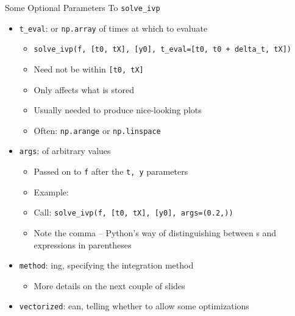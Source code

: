 
\begin{frame}{Some Optional Parameters To \texttt{solve\_ivp}}
%
\begin{itemize}
\item  \texttt{t\_eval}:  or \texttt{np.array} of times at which to evaluate
	\begin{itemize}
	\item \texttt{solve\_ivp(f, [t0, tX], [y0], t\_eval=[t0, t0 + delta\_t, tX])}
	\item Need not be within \texttt{[t0, tX]}
	\item Only affects what is stored
	\item Usually needed to produce nice-looking plots
	\item Often: \texttt{np.arange} or \texttt{np.linspace}
	\end{itemize}
\item \texttt{args}:  of arbitrary values
	\begin{itemize}
	\item Passed on to \texttt{f} after the \texttt{t, y} parameters
	\item Example: 
	\item Call: \texttt{solve\_ivp(f, [t0, tX], [y0], args=(0.2,))}
	\item Note the comma -- Python's way of distinguishing between s and expressions in parentheses
	\end{itemize}
\item \texttt{method}: ing, specifying the integration method
	\begin{itemize}
	\item More details on the next couple of slides
	\end{itemize}
\item \texttt{vectorized}: ean, telling whether to allow some optimizations
\end{itemize}
%
\end{frame}


